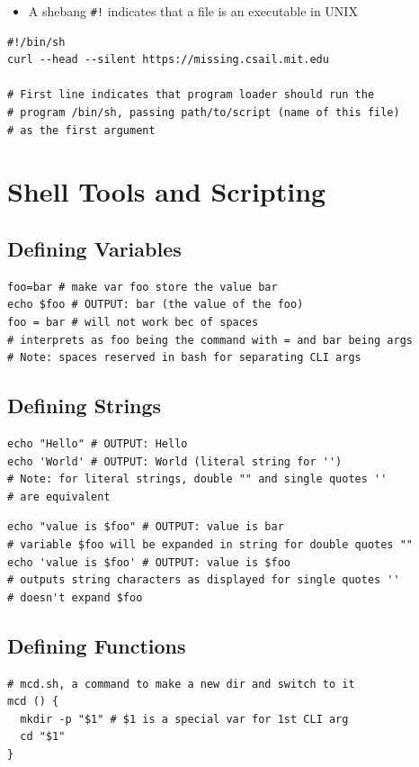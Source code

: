 \documentclass[letterpaper,12pt]{article}
\begin{document}
\begin{itemize}
 \item A shebang \lstinline{#!} indicates that a file is an executable in UNIX
\end{itemize}

\begin{lstlisting}
#!/bin/sh
curl --head --silent https://missing.csail.mit.edu

# First line indicates that program loader should run the
# program /bin/sh, passing path/to/script (name of this file)
# as the first argument
\end{lstlisting}

\section{Shell Tools and Scripting}

\subsection{Defining Variables}

\begin{lstlisting}
foo=bar # make var foo store the value bar
echo $foo # OUTPUT: bar (the value of the foo)
foo = bar # will not work bec of spaces
# interprets as foo being the command with = and bar being args
# Note: spaces reserved in bash for separating CLI args
\end{lstlisting}

\subsection{Defining Strings}

\begin{lstlisting}
echo "Hello" # OUTPUT: Hello
echo 'World' # OUTPUT: World (literal string for '')
# Note: for literal strings, double "" and single quotes ''
# are equivalent
\end{lstlisting}

\begin{lstlisting}
echo "value is $foo" # OUTPUT: value is bar
# variable $foo will be expanded in string for double quotes ""
echo 'value is $foo' # OUTPUT: value is $foo
# outputs string characters as displayed for single quotes ''
# doesn't expand $foo
\end{lstlisting}

\subsection{Defining Functions}
\begin{lstlisting}
# mcd.sh, a command to make a new dir and switch to it
mcd () {
  mkdir -p "$1" # $1 is a special var for 1st CLI arg
  cd "$1"
}
\end{lstlisting}
\end{document}
